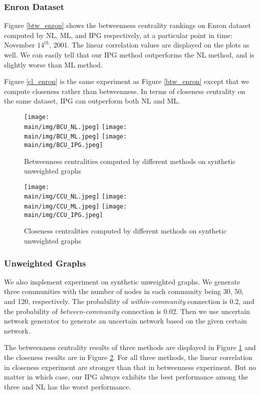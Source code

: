 \documentclass[\main/thesis.tex]{subfiles}
\begin{document}
\subsubsection{Enron Dataset}
Figure \ref{btw_enron} shows the betweenness centrality rankings on Enron dataset computed by NL, ML, and IPG respectively, at a particular point in time: November $14^{th}$, 2001. The linear correlation values are displayed on the plots as well. We can easily tell that our IPG method outperforms the NL method, and is slightly worse than ML method.

Figure \ref{cl_enron} is the same experiment as Figure \ref{btw_enron} except that we compute closeness rather than betweenness. In terms of closeness centrality on the same dataset, IPG can outperform both NL and ML.

\begin{figure}
\texttt{[image: \\main/img/BCU\_NL.jpeg]}
\texttt{[image: \\main/img/BCU\_ML.jpeg]}
\centering
\texttt{[image: \\main/img/BCU\_IPG.jpeg]}
\caption{Betweenness centralities computed by different methods on synthetic unweighted graphs}
\label{btw_unweighted}
\end{figure}

\begin{figure}
\texttt{[image: \\main/img/CCU\_NL.jpeg]}
\texttt{[image: \\main/img/CCU\_ML.jpeg]}
\centering
\texttt{[image: \\main/img/CCU\_IPG.jpeg]}
\caption{Closeness centralities computed by different methods on synthetic unweighted graphs}
\label{cl_unweighted}
\end{figure}

\subsubsection{Unweighted Graphs} \label{Unweighted-Graphs-Experiment}
We also implement experiment on synthetic unweighted graphs. We generate three communities with the number of nodes in each community being 30, 50, and 120, respectively. The probability of \textit{within-community} connection is 0.2, and the probability of \textit{between-community} connection is 0.02. Then we use uncertain network generator to generate an uncertain network based on the given certain network.

The betweenness centrality results of three methods are displayed in Figure \ref{btw_unweighted} and the closeness results are in Figure \ref{cl_unweighted}. For all three methods, the linear correlation in closeness experiment are stronger than that in betweenness experiment. But no matter in which case, our IPG always exhibits the best performance among the three and NL has the worst performance.
\end{document}

